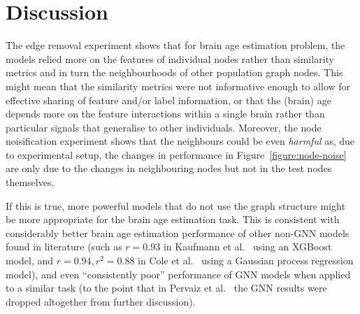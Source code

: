 \section{Discussion}
 The edge removal experiment shows that for brain age estimation problem, the models relied more on the features of individual nodes rather than similarity metrics and in turn the neighbourhoods of other population graph nodes. This might mean that the similarity metrics were not informative enough to allow for effective sharing of feature and/or label information, or that the (brain) age depends more on the feature interactions within a single brain rather than particular signals that generalise to other individuals. Moreover, the node noisification experiment shows that the neighbours could be even \textit{harmful} as, due to experimental setup, the changes in performance in Figure~\ref{figure:node-noise} are only due to the changes in neighbouring nodes but not in the test nodes themselves.

If this is true, more powerful models that do not use the graph structure might be more appropriate for the brain age estimation task. This is consistent with considerably better brain age estimation performance of other non-GNN models found in literature (such as $r=0.93$ in Kaufmann et al.~\cite{kaufmann2019} using an XGBoost model, and $r=0.94, r^2=0.88$ in Cole et al.~\cite{cole2018brain} using a Gaussian process regression model), and even ``consistently poor'' performance of GNN models when applied to a similar task (to the point that in Pervaiz et al.~\cite{pervaiz2020optimising} the GNN results were dropped altogether from further discussion).




